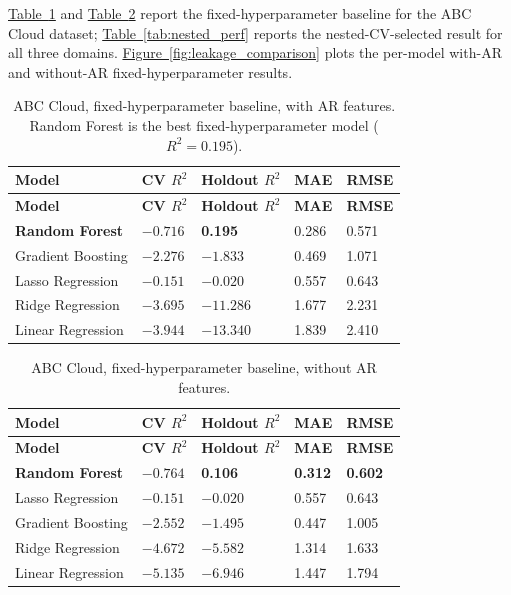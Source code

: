 \documentclass[technologies,article,submit,pdftex,moreauthors]{Definitions/mdpi}
\begin{document}
\hyperref[tab:model_perf_with]{Table~\ref*{tab:model_perf_with}} and \hyperref[tab:model_perf_without]{Table~\ref*{tab:model_perf_without}} report the fixed-hyperparameter baseline for the ABC Cloud dataset; \hyperref[tab:nested_perf]{Table~\ref*{tab:nested_perf}} reports the nested-CV-selected result for all three domains. \hyperref[fig:leakage_comparison]{Figure~\ref*{fig:leakage_comparison}} plots the per-model with-AR and without-AR fixed-hyperparameter results.

\begin{longtable}[]{@{}lllll@{}}
\caption{ABC Cloud, fixed-hyperparameter baseline, with AR features. Random Forest is the best fixed-hyperparameter model (\(R^2=0.195\)).\label{tab:model_perf_with}}\\
\toprule\noalign{}
\textbf{Model} & \textbf{CV \(R^2\)} & \textbf{Holdout \(R^2\)} & \textbf{MAE} & \textbf{RMSE} \\
\midrule\noalign{}
\endfirsthead
\toprule\noalign{}
\textbf{Model} & \textbf{CV \(R^2\)} & \textbf{Holdout \(R^2\)} & \textbf{MAE} & \textbf{RMSE} \\
\midrule\noalign{}
\endhead
\bottomrule\noalign{}
\endlastfoot
\textbf{Random Forest} & \(-0.716\) & \textbf{0.195} & 0.286 & 0.571 \\
Gradient Boosting & \(-2.276\) & \(-1.833\) & 0.469 & 1.071 \\
Lasso Regression & \(-0.151\) & \(-0.020\) & 0.557 & 0.643 \\
Ridge Regression & \(-3.695\) & \(-11.286\) & 1.677 & 2.231 \\
Linear Regression & \(-3.944\) & \(-13.340\) & 1.839 & 2.410 \\
\end{longtable}

\begin{longtable}[]{@{}lllll@{}}
\caption{ABC Cloud, fixed-hyperparameter baseline, without AR features.\label{tab:model_perf_without}}\\
\toprule\noalign{}
\textbf{Model} & \textbf{CV \(R^2\)} & \textbf{Holdout \(R^2\)} & \textbf{MAE} & \textbf{RMSE} \\
\midrule\noalign{}
\endfirsthead
\toprule\noalign{}
\textbf{Model} & \textbf{CV \(R^2\)} & \textbf{Holdout \(R^2\)} & \textbf{MAE} & \textbf{RMSE} \\
\midrule\noalign{}
\endhead
\bottomrule\noalign{}
\endlastfoot
\textbf{Random Forest} & \(-0.764\) & \textbf{0.106} & \textbf{0.312} & \textbf{0.602} \\
Lasso Regression & \(-0.151\) & \(-0.020\) & 0.557 & 0.643 \\
Gradient Boosting & \(-2.552\) & \(-1.495\) & 0.447 & 1.005 \\
Ridge Regression & \(-4.672\) & \(-5.582\) & 1.314 & 1.633 \\
Linear Regression & \(-5.135\) & \(-6.946\) & 1.447 & 1.794 \\
\end{longtable}
\end{document}
